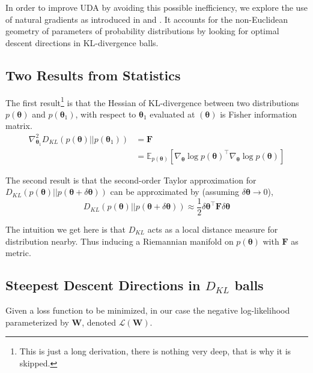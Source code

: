 \documentclass[10pt,twocolumn,letterpaper]{article}
\newcommand{\vect}[1]{\boldsymbol{\mathbf{#1}}}
\begin{document}

In order to improve UDA by avoiding this possible inefficiency, we explore the use of natural gradients as introduced in \cite{amari1998natural} and \cite{pascanu2013revisiting}. 
It accounts for the non-Euclidean geometry of parameters of probability distributions by looking for optimal descent directions in KL-divergence balls. 

\subsection{Two Results from Statistics}
The first result\footnote{This is just a long derivation, there is nothing very deep, that is why it is skipped.} is that the Hessian of KL-divergence between two distributions \(p(\vect{\theta})\) and \(p(\vect{\theta}_1)\), with respect to \(\vect{\theta}_1\) evaluated at \((\vect{\theta})\) is Fisher information matrix. 
\begin{align*}
    \nabla_{\vect{\theta}_1}^2 D_{KL}(p(\vect{\theta})|| p(\vect{\theta}_1)) &= \vect{F} \\
    &= \mathbb{E}_{p(\vect{\theta})} [\nabla_{\vect{\theta}} \log p(\vect{\theta})^{\intercal} \nabla_{\vect{\theta}} \log p(\vect{\theta})]
\end{align*}

The second result is that the second-order Taylor approximation for \(D_{KL}(p(\vect{\theta})|| p(\vect{\theta}+\delta \vect{\theta} ))\) can be approximated by (assuming \(\delta \vect{\theta} \to 0\)),
\begin{equation} \label{eq:KL-tsapprox}
D_{KL}(p(\vect{\theta})|| p(\vect{\theta}+\delta \vect{\theta} )) \approx \frac{1}{2}\delta \vect{\theta}^{\intercal}\vect{F}\delta \vect{\theta}
\end{equation}

The intuition we get here is that \(D_{KL}\) acts as a local distance measure for distribution nearby.
Thus inducing a Riemannian manifold on \(p(\vect{\theta})\) with \(\vect{F}\) as metric.

\subsection{Steepest Descent Directions in \(D_{KL}\) balls}
Given a loss function to be minimized, in our case the negative log-likelihood parameterized by \(\vect{W}\), denoted \(\mathcal{L}(\vect{W})\).
\end{document}
